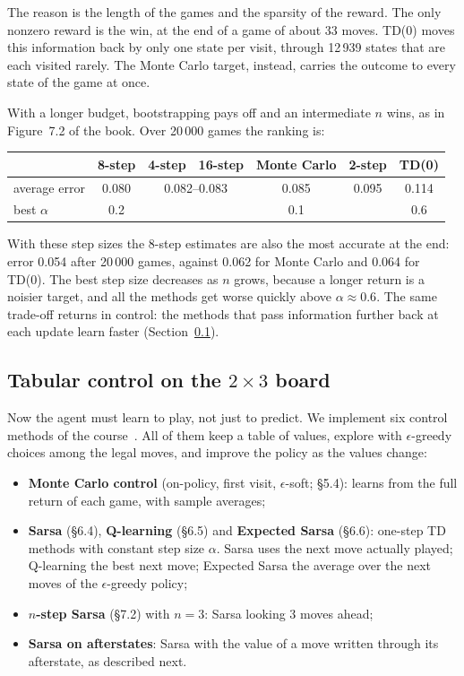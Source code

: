 \documentclass[11pt,a4paper]{article}
\theoremstyle{remark}
\begin{document}
The reason is the length of the games and the sparsity of the reward. The only nonzero reward is the win, at the end of a game of about 33 moves. TD(0) moves this information back by only one state per visit, through 12\,939 states that are each visited rarely. The Monte Carlo target, instead, carries the outcome to every state of the game at once.

With a longer budget, bootstrapping pays off and an intermediate $n$ wins, as in Figure~7.2 of the book. Over 20\,000 games the ranking is:

\begin{center}\small
\begin{tabular}{lcccccc}
\toprule
 & 8-step & 4-step & 16-step & Monte Carlo & 2-step & TD(0)\\
\midrule
average error & 0.080 & \multicolumn{2}{c}{0.082--0.083} & 0.085 & 0.095 & 0.114\\
best $\alpha$ & 0.2 & & & 0.1 & & 0.6\\
\bottomrule
\end{tabular}
\end{center}

With these step sizes the 8-step estimates are also the most accurate at the end: error 0.054 after 20\,000 games, against 0.062 for Monte Carlo and 0.064 for TD(0). The best step size decreases as $n$ grows, because a longer return is a noisier target, and all the methods get worse quickly above $\alpha\approx0.6$. The same trade-off returns in control: the methods that pass information further back at each update learn faster (Section~\ref{sec:tabular}).

\subsection{Tabular control on the $2\times3$ board}
\label{sec:tabular}

Now the agent must learn to play, not just to predict. We implement six control methods of the course~\cite{sutton2018}. All of them keep a table of values, explore with $\epsilon$-greedy choices among the legal moves, and improve the policy as the values change:
\begin{itemize}[leftmargin=*]
\item \textbf{Monte Carlo control} (on-policy, first visit, $\epsilon$-soft; \S5.4): learns from the full return of each game, with sample averages;
\item \textbf{Sarsa} (\S6.4), \textbf{Q-learning} (\S6.5) and \textbf{Expected Sarsa} (\S6.6): one-step TD methods with constant step size $\alpha$. Sarsa uses the next move actually played; Q-learning the best next move; Expected Sarsa the average over the next moves of the $\epsilon$-greedy policy;
\item \textbf{$n$-step Sarsa} (\S7.2) with $n=3$: Sarsa looking 3 moves ahead;
\item \textbf{Sarsa on afterstates}: Sarsa with the value of a move written through its afterstate, as described next.
\end{itemize}
\end{document}
